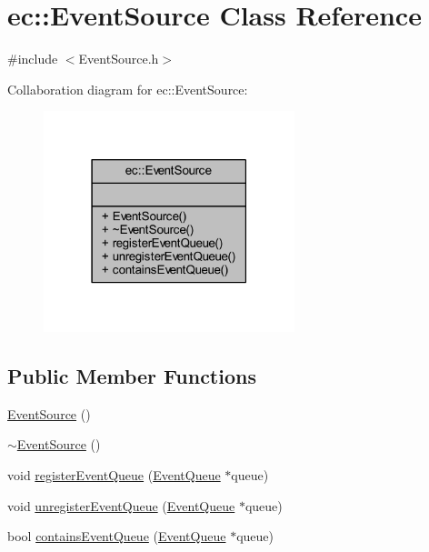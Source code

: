 \hypertarget{classec_1_1_event_source}{}\section{ec\+:\+:Event\+Source Class Reference}
\label{classec_1_1_event_source}


{\ttfamily \#include $<$Event\+Source.\+h$>$}



Collaboration diagram for ec\+:\+:Event\+Source\+:\nopagebreak
\begin{figure}[H]
\begin{center}
\leavevmode
\includegraphics[width=207pt]{classec_1_1_event_source__coll__graph}
\end{center}
\end{figure}
\subsection*{Public Member Functions}
\begin{DoxyCompactItemize}
\item 
\mbox{\hyperlink{classec_1_1_event_source_a7ccb3e423c3009e4384a2ecf1cd48f57}{Event\+Source}} ()
\item 
\mbox{\hyperlink{classec_1_1_event_source_abac24e47613cacddde6e86da5bc1cb4c}{$\sim$\+Event\+Source}} ()
\item 
void \mbox{\hyperlink{classec_1_1_event_source_a264c33075bc703f5b2b25d2d8b3fbd59}{register\+Event\+Queue}} (\mbox{\hyperlink{classec_1_1_event_queue}{Event\+Queue}} $\ast$queue)
\item 
void \mbox{\hyperlink{classec_1_1_event_source_a70bb21924f6d09e93921ad2cf5770413}{unregister\+Event\+Queue}} (\mbox{\hyperlink{classec_1_1_event_queue}{Event\+Queue}} $\ast$queue)
\item 
bool \mbox{\hyperlink{classec_1_1_event_source_af11e74f9f7bfa7c9072668ca06f60408}{contains\+Event\+Queue}} (\mbox{\hyperlink{classec_1_1_event_queue}{Event\+Queue}} $\ast$queue)
\end{DoxyCompactItemize}


